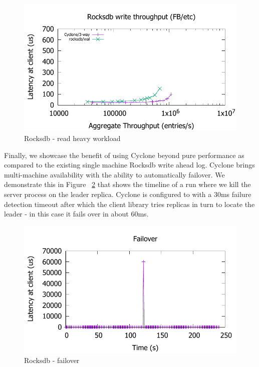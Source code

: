 \documentclass[pageno]{jpaper}
\begin{document}
\begin{figure}
\includegraphics[scale=0.6]{results2/fb.pdf}
\caption{Rocksdb - read heavy workload}
\label{fig:fb}
\end{figure}

Finally, we showcase the benefit of using Cyclone beyond pure performance as
compared to the existing single machine Rocksdb write ahead log. Cyclone brings
multi-machine availability with the ability to automatically failover. We
demonstrate this in Figure ~\ref{fig:timeline} that shows the timeline of a run
where we kill the server process on the leader replica. Cyclone is configured to
with a 30ms failure detection timeout after which the client library tries
replicas in turn to locate the leader - in this case it fails over in about
60ms.

\begin{figure}
\includegraphics[scale=0.6]{results2/failover.pdf}
\caption{Rocksdb - failover}
\label{fig:timeline}
\end{figure}
\end{document}

